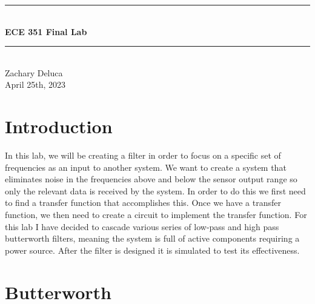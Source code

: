 \documentclass[12pt,a4paper]{article}
\newcommand{\HRule}{\rule{\linewidth}{0.5mm}}
\begin{document}
\begin{titlepage}
	\begin{center}

		
		\HRule \\[0.4cm]
		{ \LARGE 
			\textbf{ECE 351 Final Lab}\\[0.4cm]
		}
		\HRule \\[1.5cm]
		
		
		
		{ \large
			Zachary Deluca \\[0.1cm]
			April 25th, 2023\\[0.1cm]
		}
		
		\vfill
		
	
		
		
	\end{center}
\end{titlepage}


\newpage




\setcounter{page}{1}

\hline
\section*{Introduction}
	In this lab, we will be creating a filter in order to focus on a specific set of frequencies as an input to another system. We want to create a system that eliminates noise in the frequencies above and below the sensor output range so only the relevant data is received by the system. In order to do this we first need to find a transfer function that accomplishes this. Once we have a transfer function, we then need to create a circuit to implement the transfer function. For this lab I have decided to cascade various series of low-pass and high pass butterworth filters, meaning the system is full of active components requiring a power source. After the filter is designed it is simulated to test its effectiveness. 

\section*{Butterworth}
\end{document}

